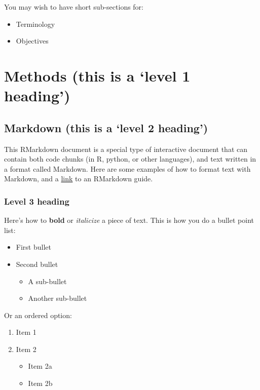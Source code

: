\documentclass[]{elsarticle} %
\providecommand{\tightlist}{%
  \setlength{\itemsep}{0pt}\setlength{\parskip}{0pt}}
\begin{document}
You may wish to have short sub-sections for:

\begin{itemize}
\tightlist
\item
  Terminology
\item
  Objectives
\end{itemize}

\section{\texorpdfstring{Methods (this is a `level 1
heading')}{Methods (this is a level 1 heading)}}\label{methods-this-is-a-level-1-heading}

\subsection{\texorpdfstring{Markdown (this is a `level 2
heading')}{Markdown (this is a level 2 heading)}}\label{markdown-this-is-a-level-2-heading}

This RMarkdown document is a special type of interactive document that
can contain both code chunks (in R, python, or other languages), and
text written in a format called Markdown. Here are some examples of how
to format text with Markdown, and a
\href{https://www.rstudio.com/wp-content/uploads/2015/03/rmarkdown-reference.pdf}{link}
to an RMarkdown guide.

\subsubsection{Level 3 heading}\label{level-3-heading}

Here's how to \textbf{bold} or \emph{italicize} a piece of text. This is
how you do a bullet point list:

\begin{itemize}
\tightlist
\item
  First bullet
\item
  Second bullet

  \begin{itemize}
  \tightlist
  \item
    A sub-bullet
  \item
    Another sub-bullet
  \end{itemize}
\end{itemize}

Or an ordered option:

\begin{enumerate}
\def\labelenumi{\arabic{enumi}.}
\tightlist
\item
  Item 1
\item
  Item 2

  \begin{itemize}
  \tightlist
  \item
    Item 2a
  \item
    Item 2b
  \end{itemize}
\end{enumerate}
\end{document}
